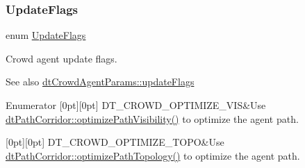 \subsubsection{\texorpdfstring{Update\+Flags}{UpdateFlags}\hspace{0.1cm}{\footnotesize\ttfamily [1/2]}}
{\footnotesize\ttfamily enum \hyperlink{group__crowd_gaa94b67d2fdcc390690c523f28019e52f}{Update\+Flags}}

Crowd agent update flags.

\begin{DoxySeeAlso}{See also}
\hyperlink{structdtCrowdAgentParams_a7066a4477bbfa53fc1c983e17aa3e5ae}{dt\+Crowd\+Agent\+Params\+::update\+Flags} 
\end{DoxySeeAlso}
\begin{DoxyEnumFields}{Enumerator}
[0pt][0pt]{}\mbox{\label{group__crowd_ggaa94b67d2fdcc390690c523f28019e52fad11f447facf1bf42c09de64e9483f3aa}} 
D\+T\+\_\+\+C\+R\+O\+W\+D\+\_\+\+O\+P\+T\+I\+M\+I\+Z\+E\+\_\+\+V\+IS&Use \hyperlink{classdtPathCorridor_a3970b6cd229731debe6beb41d9885463}{dt\+Path\+Corridor\+::optimize\+Path\+Visibility()} to optimize the agent path. \\
\hline

[0pt][0pt]{}\mbox{\label{group__crowd_ggaa94b67d2fdcc390690c523f28019e52fa89c6f7f2e49254e775cb2b85259a0a93}} 
D\+T\+\_\+\+C\+R\+O\+W\+D\+\_\+\+O\+P\+T\+I\+M\+I\+Z\+E\+\_\+\+T\+O\+PO&Use \hyperlink{classdtPathCorridor_a69288d28ab5d23b2c2654e45c5a33c25}{dt\+Path\+Corridor\+::optimize\+Path\+Topology()} to optimize the agent path. \\
\hline


\end{DoxyEnumFields}
